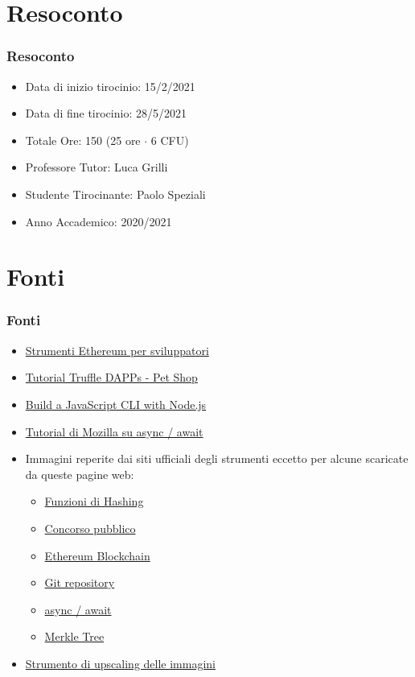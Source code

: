 \documentclass{beamer}
\begin{document}
\section{Resoconto}
\begin{frame}
	\frametitle{Resoconto}
	\begin{itemize}
		\item Data di inizio tirocinio: 15/2/2021
  		\item Data di fine tirocinio: 28/5/2021
  		\item Totale Ore: 150 (25 ore \(\cdot\) 6 CFU)
  		\item Professore Tutor: Luca Grilli
  		\item Studente Tirocinante: Paolo Speziali
  		\item Anno Accademico: 2020/2021
	\end{itemize}
\end{frame}
\section{Fonti}
\begin{frame}
	\frametitle{Fonti}
	\begin{itemize}
		\item \href{https://ethereum.org/it/developers/}{Strumenti Ethereum per sviluppatori} 
  		\item \href{https://www.trufflesuite.com/tutorial}{Tutorial Truffle DAPPs - Pet Shop}
  		\item \href{https://www.sitepoint.com/javascript-command-line-interface-cli-node-js/}{Build a JavaScript CLI with Node.js}
  		\item \href{https://developer.mozilla.org/en-US/docs/Learn/JavaScript/Asynchronous/Async_await}{Tutorial di Mozilla su async / await}
  		\item Immagini reperite dai siti ufficiali degli strumenti eccetto per alcune scaricate da queste pagine web:
			\begin{itemize}
				\item \href{https://www.poeticoding.com/hashing-a-file-in-elixir/}{Funzioni di Hashing}
				\item \href{https://www.romatoday.it/attualita/concorso-rai-fiera-roma-norme-covid-19.html}{Concorso pubblico}
				\item \href{https://www.criptovalute24.com/ethereum-migliora-la-sua-blockchain-rialzo-del-5-4/}{Ethereum Blockchain}
				\item \href{https://blog.netsons.com/git-software-guida-facile/}{Git repository}
				\item \href{https://amerlin.keantex.com/programmazione-asincrona-con-async-await-parte-2/}{async / await}
				\item \href{https://transparency.dev/verifiable-data-structures/}{Merkle Tree}
			\end{itemize}
			\item \href{https://waifu2x.booru.pics/Home/index}{Strumento di upscaling delle immagini} 
	\end{itemize}
\end{frame}
\end{document}
